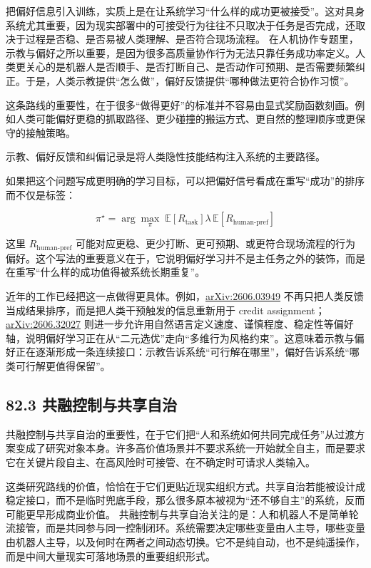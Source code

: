 把偏好信息引入训练，实质上是在让系统学习“什么样的成功更被接受”。这对具身系统尤其重要，因为现实部署中的可接受行为往往不只取决于任务是否完成，还取决于过程是否稳、是否易被人类理解、是否符合现场流程。 在人机协作专题里，示教与偏好之所以重要，是因为很多高质量协作行为无法只靠任务成功率定义。人类更关心的是机器人是否顺手、是否打断自己、是否动作可预期、是否需要频繁纠正。于是，人类示教提供“怎么做”，偏好反馈提供“哪种做法更符合协作习惯”。

这条路线的重要性，在于很多“做得更好”的标准并不容易由显式奖励函数刻画。例如人类可能偏好更稳的抓取路径、更少碰撞的搬运方式、更自然的整理顺序或更保守的接触策略。

示教、偏好反馈和纠偏记录是将人类隐性技能结构注入系统的主要路径。

如果把这个问题写成更明确的学习目标，可以把偏好信号看成在重写“成功”的排序而不仅是标签：

\begingroup
\scriptsize
\begin{equation*}
\pi^\star = \arg\max_{\pi}\; \mathbb{E}[R_{\text{task}}]
\lambda \, \mathbb{E}[R_{\text{human-pref}}]
\end{equation*}
\endgroup

这里 \(R_{\text{human-pref}}\) 可能对应更稳、更少打断、更可预期、或更符合现场流程的行为偏好。这个写法的重要意义在于，它说明偏好学习并不是主任务之外的装饰，而是在重写“什么样的成功值得被系统长期重复”。

近年的工作已经把这一点做得更具体。例如，\href{https://arxiv.org/abs/2606.03949}{arXiv:2606.03949} 不再只把人类反馈当成结果排序，而是把人类干预触发的信息重新用于 credit assignment；\href{https://arxiv.org/abs/2606.32027}{arXiv:2606.32027} 则进一步允许用自然语言定义速度、谨慎程度、稳定性等偏好轴，说明偏好学习正在从“二元选优”走向“多维行为风格约束”。这意味着示教与偏好正在逐渐形成一条连续接口：示教告诉系统“可行解在哪里”，偏好告诉系统“哪类可行解更值得保留”。

\subsection*{82.3 共融控制与共享自治}


共融控制与共享自治的重要性，在于它们把“人和系统如何共同完成任务”从过渡方案变成了研究对象本身。许多高价值场景并不要求系统一开始就全自主，而是要求它在关键片段自主、在高风险时可接管、在不确定时可请求人类输入。

这类研究路线的价值，恰恰在于它们更贴近现实组织方式。共享自治若能被设计成稳定接口，而不是临时兜底手段，那么很多原本被视为“还不够自主”的系统，反而可能更早形成商业价值。 共融控制与共享自治关注的是：人和机器人不是简单轮流接管，而是共同参与同一控制闭环。系统需要决定哪些变量由人主导，哪些变量由机器人主导，以及何时在两者之间动态切换。它不是纯自动，也不是纯遥操作，而是中间大量现实可落地场景的重要组织形式。


